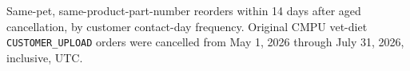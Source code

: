 Same-pet, same-product-part-number reorders within 14 days after aged cancellation, by customer contact-day frequency. Original CMPU vet-diet \texttt{CUSTOMER\_UPLOAD} orders were cancelled from May 1, 2026 through July 31, 2026, inclusive, UTC.
